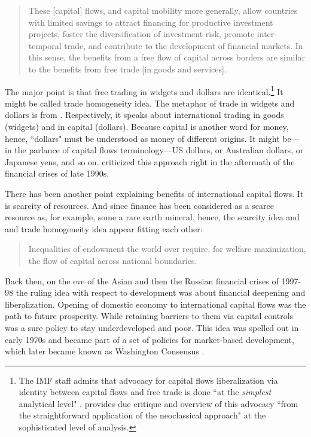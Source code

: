 \begin{quote}
These [capital] flows, and capital mobility more generally, allow countries with limited savings to attract financing for productive investment projects, foster the diversification of investment risk, promote inter-temporal trade, and contribute to the development of financial markets. In this sense, the benefits from a free flow of capital across borders are similar to the benefits from free trade [in goods and services]. \citep[p.~4]{ostry2010}
\end{quote}

The major point is that free trading in widgets and dollars are identical.\footnote{The IMF staff admits that advocacy for capital flows liberalization via identity between capital flows and free trade is done ``at the \textit{simplest} analytical level" \citep[p.~1137, emphasis added]{citrin_fischer2000}. \citep{kregel2008} provides due critique and overview of this advocacy ``from the straightforward application of the neoclassical approach" at the sophisticated level of analysis.} It might be called trade homogeneity idea.
The metaphor of trade in widgets and dollars is from \cite{bhagwati1998a}. Respectively, it speaks about international trading in goods (widgets) and in capital (dollars).
Because capital is another word for money, hence, ``dollars" must be understood as money of different origins. It might be---in the parlance of capital flows terminology---US dollars, or Australian dollars, or Japanese yens, and so on. \cite{bhagwati1998a,bhagwati1998b} criticized this approach right in the aftermath of the financial crises of late 1990s.

There has been another point explaining benefits of international capital flows. It is scarcity of resources. And since finance has been considered as a scarce resource as, for example, some a rare earth mineral, hence, the scarcity idea and and trade homogeneity idea appear fitting each other:

\begin{quote}
Inequalities of endowment the world over require, for welfare maximization, the flow of capital across national boundaries. \citep[p.~212]{shaw1973}
\end{quote}

Back then, on the eve of the Asian and then the Russian financial crises of 1997-98 the ruling idea with respect to development was about financial deepening and liberalization. Opening of domestic economy to international capital flows was the path to future prosperity. While retaining barriers to them via capital controls was a sure policy to stay underdeveloped and poor. This idea was spelled out in early 1970s and became part of a set of policies for market-based development, which later became known as Washington Consensus \citep[see][]{shaw1973,mckinnon1973,williamson2004,kforbes2005}.

